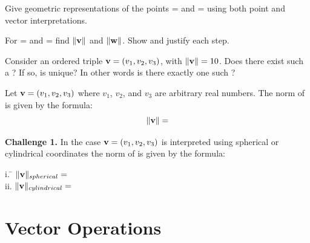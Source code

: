 \begin{myexa}[\bd{a}]
	{Give geometric representations of the points  =  and  =  using both point and vector interpretations. }
\end{myexa}

\begin{myexb}[\bd{b}]
	{For  =  and  =  find $\|\mathbf{v}\|$ and $\|\mathbf{w}\|$. Show and justify each step.}
\end{myexb}

\begin{myexc}[\bd{c}]
	{Consider an ordered triple $\mathbf{v}=({v_1},{v_2},{v_3})$, with $\|\mathbf{v}\|=10$. Does there exist such a ?  If so, is  unique?  In other words is there exactly one such ? }
\end{myexc}

\begin{theorem}
	Let $\mathbf{v}=({v_1},{v_2},{v_3})$ where $v_1$, $v_2$, and $v_3$ are arbitrary real numbers. The norm of  is given by the formula:
	 \[ \|\mathbf{v}\|= \]
\end{theorem}
\vspace{-.3in}\hspace{5in}\begin{annotation}
\end{annotation}

	
\noindent \textbf{Challenge 1.}  In the case $\mathbf{v}=({v_1},{v_2},{v_3})$ is interpreted using spherical or cylindrical coordinates the norm of  is given by the formula: 
\begin{tabbing}
\indent   i. \space  \= $ \|\mathbf{v}\|_{spherical}  = $ \\
\indent  ii. \> $ \|\mathbf{v}\|_{cylindrical}  =$  \\
\end{tabbing}


\section{Vector Operations}      \label{Vector Operations}

